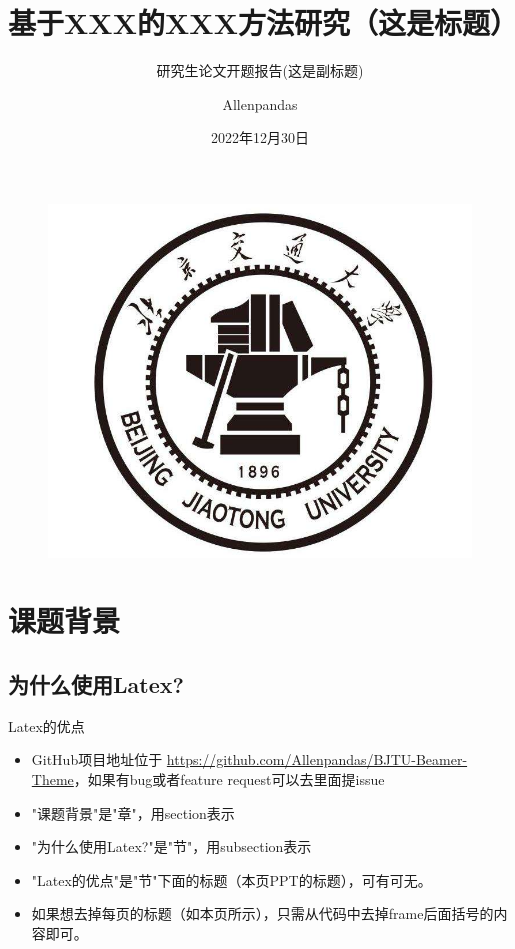 \documentclass{beamer}
\author{Allenpandas}
\title{基于XXX的XXX方法研究（这是标题）}
\subtitle{研究生论文开题报告(这是副标题)}
\institute{北京交通大学XXX学院}
\date{2022年12月30日}
\begin{document}
\kaishu
\begin{frame}
    \titlepage
    \begin{figure}[htpb]
        \begin{center}
            \includegraphics[width=0.2\linewidth]{pic/bjtu_logo.jpeg}
        \end{center}
    \end{figure}
\end{frame}


\begin{frame}
    \tableofcontents[sectionstyle=show,subsectionstyle=show/shaded/hide,subsubsectionstyle=show/shaded/hide]
\end{frame}


\section{课题背景}
\subsection{为什么使用Latex?}
\begin{frame}{Latex的优点}
    \begin{itemize}
        \item GitHub项目地址位于 \url{https://github.com/Allenpandas/BJTU-Beamer-Theme}，如果有bug或者feature request可以去里面提issue
        \item "课题背景"是"章"，用section表示
        \item "为什么使用Latex?"是"节"，用subsection表示
        \item "Latex的优点"是"节"下面的标题（本页PPT的标题），可有可无。
    \end{itemize}
\end{frame}

\begin{frame}{}
    \begin{itemize}
        \item 如果想去掉每页的标题（如本页所示），只需从代码中去掉{frame}后面括号的内容即可。
    \end{itemize}
\end{frame}
\end{document}
